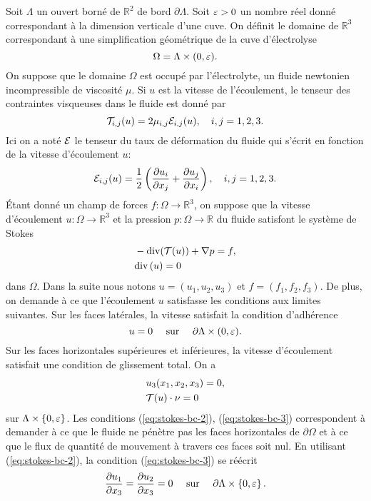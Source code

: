 Soit $\Lambda$ un ouvert borné de $\mathbb R^2$ de bord
$\partial\Lambda$. Soit $\varepsilon > 0$ un nombre réel donné
correspondant à la dimension verticale d'une cuve. On définit le
domaine de $\mathbb R^3$ correspondant à une simplification
géométrique de la cuve d'électrolyse
\begin{equation}
  \Omega = \Lambda \times (0,\varepsilon).
\end{equation}
On suppose que le domaine $\Omega$ est occupé par l'électrolyte, un
fluide newtonien incompressible de viscosité $\mu$. Si $u$ est la
vitesse de l'écoulement, le tenseur des contraintes visqueuses dans le
fluide \cite{Landau1987} est donné par
\begin{equation}
  \mathcal T_{i,j}(u) = 2\mu_{i,j}
  \mathcal E_{i,j}(u),\quad i,j = 1,2,3.
\end{equation}
Ici on a noté $\mathcal E$ le tenseur du taux de déformation du fluide qui s'écrit
en fonction de la vitesse d'écoulement $u$:
\begin{equation}
  \mathcal E_{i,j}(u) = \frac{1}{2}\left( \frac{\partial u_i}{\partial x_j} + \frac{\partial u_j}{\partial x_i} \right),\quad i,j = 1,2,3.
\end{equation}
Étant donné un champ de forces $f:\Omega\to \mathbb R^3$, on suppose
que la vitesse d'écoulement $u:\Omega \to \mathbb R^3$ et la pression
$p:\Omega \to \mathbb R$ du fluide satisfont le système de Stokes
\begin{align}
  &- \mathrm{div}(\mathcal T(u)) + \nabla p = f,\label{eq:stokes-u}\\
  &\mathrm{div} \left( u \right) = 0\label{eq:stokes-p}
\end{align}
dans $\Omega$. Dans la suite nous notons $u = (u_1, u_2, u_3)$ et $f =
(f_1, f_2, f_3)$. De plus, on demande à ce que l'écoulement $u$ satisfasse
les conditions aux limites suivantes. Sur les faces latérales, la
vitesse satisfait la condition d'adhérence
\begin{equation}
  u = 0\quad \text{ sur } \quad\partial \Lambda\times(0,\varepsilon).\label{eq:stokes-bc-1}
\end{equation}
Sur les faces horizontales supérieures et inférieures, la vitesse
d'écoulement satisfait une condition de glissement total. On a
\begin{align}
  &u_3(x_1, x_2, x_3) = 0,\label{eq:stokes-bc-2}\\
  &\mathcal T(u)\cdot \nu = 0\label{eq:stokes-bc-3}
\end{align}
sur $\Lambda \times\left\{ 0,\varepsilon \right\}$.
Les conditions (\ref{eq:stokes-bc-2}), (\ref{eq:stokes-bc-3})
correspondent à demander à ce que le fluide ne pénètre pas les faces
horizontales de $\partial\Omega$ et à ce que le flux de quantité de
mouvement à travers ces faces soit nul. En utilisant
(\ref{eq:stokes-bc-2}), la condition (\ref{eq:stokes-bc-3}) se réécrit
\begin{equation}
\frac{\partial u_1}{\partial x_3}
  = \frac{\partial u_2}{\partial x_3}
  = 0\quad \text{ sur }\quad\partial \Lambda \times\left\{ 0,\varepsilon \right\}.
\end{equation}

